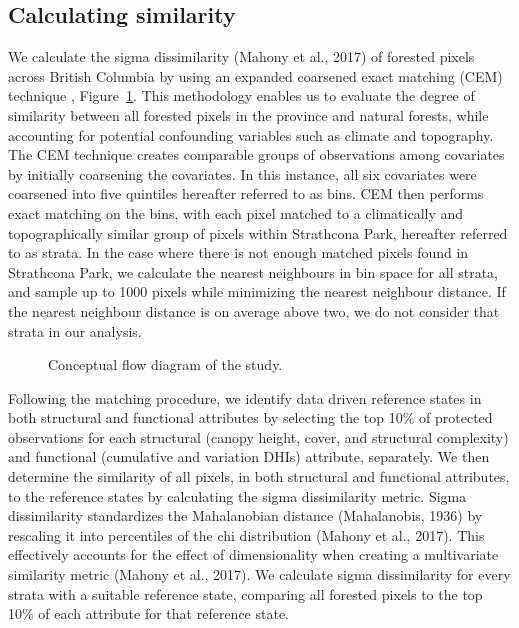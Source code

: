 \documentclass[
]{agujournal2019}
\begin{document}
\subsection{Calculating similarity}\label{sec-sim}

We calculate the sigma dissimilarity (Mahony et al., 2017) of forested
pixels across British Columbia by using an expanded coarsened exact
matching (CEM) technique , Figure~\ref{fig-flow}. This methodology
enables us to evaluate the degree of similarity between all forested
pixels in the province and natural forests, while accounting for
potential confounding variables such as climate and topography. The CEM
technique creates comparable groups of observations among covariates by
initially coarsening the covariates. In this instance, all six
covariates were coarsened into five quintiles hereafter referred to as
bins. CEM then performs exact matching on the bins, with each pixel
matched to a climatically and topographically similar group of pixels
within Strathcona Park, hereafter referred to as strata. In the case
where there is not enough matched pixels found in Strathcona Park, we
calculate the nearest neighbours in bin space for all strata, and sample
up to 1000 pixels while minimizing the nearest neighbour distance. If
the nearest neighbour distance is on average above two, we do not
consider that strata in our analysis.

\label{cell-fig-flow}
\begin{figure}[H]


\caption{\label{fig-flow}Conceptual flow diagram of the study.}

\end{figure}%

Following the matching procedure, we identify data driven reference
states in both structural and functional attributes by selecting the top
10\% of protected observations for each structural (canopy height,
cover, and structural complexity) and functional (cumulative and
variation DHIs) attribute, separately. We then determine the similarity
of all pixels, in both structural and functional attributes, to the
reference states by calculating the sigma dissimilarity metric. Sigma
dissimilarity standardizes the Mahalanobian distance (Mahalanobis, 1936)
by rescaling it into percentiles of the chi distribution (Mahony et al.,
2017). This effectively accounts for the effect of dimensionality when
creating a multivariate similarity metric (Mahony et al., 2017). We
calculate sigma dissimilarity for every strata with a suitable reference
state, comparing all forested pixels to the top 10\% of each attribute
for that reference state.
\end{document}
